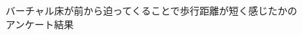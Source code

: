\begin{figure}[H]
    \centering
    \caption{バーチャル床が前から迫ってくることで歩行距離が短く感じたかのアンケート結果}
    \label{fig:f3}
\end{figure}
